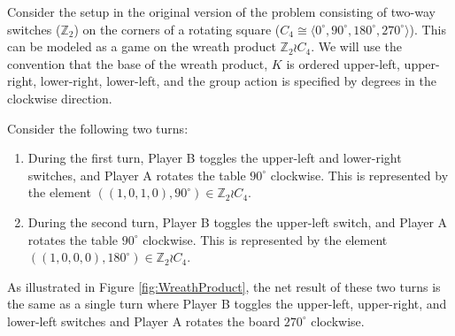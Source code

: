 \begin{example}
  Consider the setup in the original version of the problem consisting of
  two-way switches ($\mathbb Z_2$)
  on the corners of a rotating square
  ($C_4 \cong \langle 0^\circ, 90^\circ, 180^\circ, 270^\circ \rangle$).
  This can be modeled as a game on the wreath product $\mathbb Z_2 \wr C_4$.
  We will use the convention that the base of the wreath product, $K$ is
  ordered upper-left, upper-right, lower-right, lower-left, and the group
  action is specified by degrees in the clockwise direction.

  Consider the following two turns:
  \begin{enumerate}
    \item During the first turn,
    Player B toggles the upper-left and lower-right switches, and
    Player A rotates the table $90^\circ$ clockwise.
    This is represented by the element
    $((1,0,1,0), 90^\circ) \in \mathbb Z_2 \wr C_4$.
    \item During the second turn,
    Player B toggles the upper-left switch, and
    Player A rotates the table $90^\circ$ clockwise.
    This is represented by the element
    $((1,0,0,0), 180^\circ) \in \mathbb Z_2 \wr C_4$.
  \end{enumerate}

  As illustrated in Figure \ref{fig:WreathProduct},
  the net result of these two turns is the same as
  a single turn where Player B toggles the upper-left, upper-right, and lower-left
  switches and Player A rotates the board $270^\circ$ clockwise.

  \begin{figure}
    \center
\end{figure}
\end{example}

